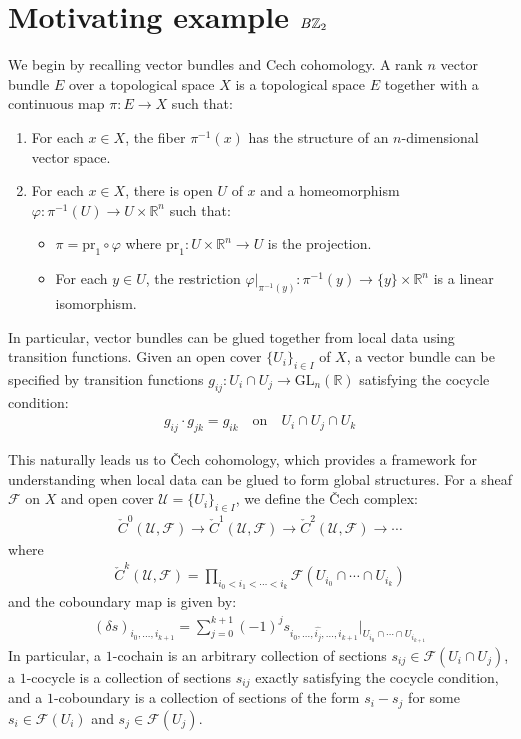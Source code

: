 \documentclass[12pt]{article}
\begin{document}
\section{Motivating example $B\mathbb{Z}_2$}
We begin by recalling vector bundles and Cech cohomology. A rank $n$ vector bundle $E$ over a topological space $X$ is a topological space $E$ together with a continuous map $\pi: E \to X$ such that:
\begin{enumerate}
    \item For each $x \in X$, the fiber $\pi^{-1}(x)$ has the structure of an $n$-dimensional vector space.
    \item For each $x \in X$, there is open $U$ of $x$ and a homeomorphism $\varphi: \pi^{-1}(U) \to U \times \mathbb{R}^n$ such that:
          \begin{itemize}
              \item $\pi = \text{pr}_1 \circ \varphi$ where $\text{pr}_1: U \times \mathbb{R}^n \to U$ is the projection.
              \item For each $y \in U$, the restriction $\varphi|_{\pi^{-1}(y)}: \pi^{-1}(y) \to \{y\} \times \mathbb{R}^n$ is a linear isomorphism.
          \end{itemize}
\end{enumerate}

In particular, vector bundles can be glued together from local data using transition functions. Given an open cover $\{U_i\}_{i \in I}$ of $X$, a vector bundle can be specified by transition functions $g_{ij}: U_i \cap U_j \to \text{GL}_n(\mathbb{R})$ satisfying the cocycle condition:
\begin{align*}
    g_{ij} \cdot g_{jk} = g_{ik} \quad \text{on} \quad U_i \cap U_j \cap U_k
\end{align*}

This naturally leads us to Čech cohomology, which provides a framework for understanding when local data can be glued to form global structures. For a sheaf $\mathcal{F}$ on $X$ and open cover $\mathcal{U} = \{U_i\}_{i \in I}$, we define the Čech complex:
\begin{align*}
    \check{C}^0(\mathcal{U}, \mathcal{F}) \to \check{C}^1(\mathcal{U}, \mathcal{F}) \to \check{C}^2(\mathcal{U}, \mathcal{F}) \to \cdots
\end{align*} where
\begin{align*}
    \check{C}^k(\mathcal{U}, \mathcal{F}) = \prod_{i_0 < i_1 < \cdots < i_k} \mathcal{F}(U_{i_0} \cap \cdots \cap U_{i_k})
\end{align*} and the coboundary map is given by:
\begin{align*}
    (\delta s)_{i_0, \ldots, i_{k+1}} = \sum_{j=0}^{k+1} (-1)^j s_{i_0, \ldots, \hat{i_j}, \ldots, i_{k+1}}|_{U_{i_0} \cap \cdots \cap U_{i_{k+1}}}
\end{align*}
In particular, a $1$-cochain is an arbitrary collection of sections $s_{ij} \in \mathcal{F}(U_i \cap U_j)$, a $1$-cocycle is a collection of sections $s_{ij}$ exactly satisfying the cocycle condition, and a $1$-coboundary is a collection of sections of the form $s_i - s_j$ for some $s_i \in \mathcal{F}(U_i)$ and $s_j \in \mathcal{F}(U_j)$.
\end{document}

